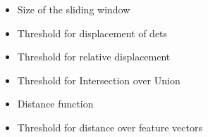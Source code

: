 \begin{itemize}
    \item Size of the sliding window
    \item Threshold for displacement of \glspl{det}
    \item Threshold for relative displacement
    \item Threshold for Intersection over Union
    \item Distance function
    \item Threshold for distance over feature vectors
\end{itemize}
